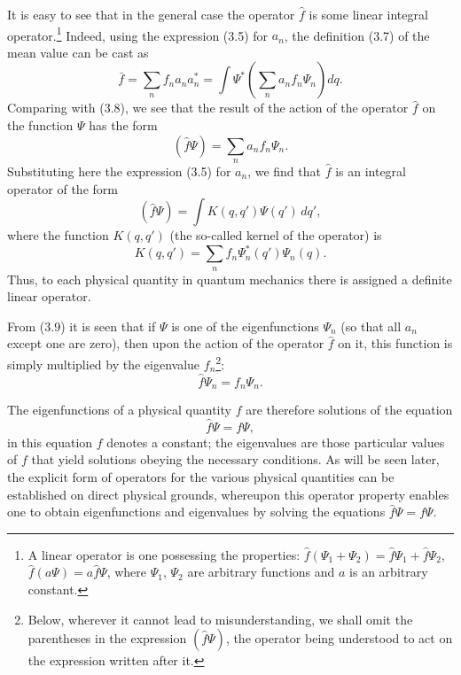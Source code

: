 It is easy to see that in the general case the operator $\hat f$ is some linear
integral operator.\footnote{A linear operator is one possessing the properties:
$\hat f(\Psi_1+\Psi_2)=\hat f\Psi_1+\hat f\Psi_2$,
$\hat f(a\Psi)=a\hat f\Psi$, where $\Psi_1$, $\Psi_2$ are arbitrary functions
and $a$ is an arbitrary constant.} Indeed, using the expression (3.5) for
$a_n$, the definition (3.7) of the mean value can be cast as
\[
  \bar f = \sum_n f_n a_n a_n^*
  = \int \Psi^*\left(\sum_n a_n f_n\Psi_n\right)dq.
\]
Comparing with (3.8), we see that the result of the action of the operator
$\hat f$ on the function $\Psi$ has the form
\begin{equation}
  (\hat f\Psi)=\sum_n a_n f_n\Psi_n.
  \tag{3.9}
\end{equation}
Substituting here the expression (3.5) for $a_n$, we find that $\hat f$ is an
integral operator of the form
\begin{equation}
  (\hat f\Psi)=\int K(q,q')\Psi(q')\,dq',
  \tag{3.10}
\end{equation}
where the function $K(q,q')$ (the so-called kernel of the operator) is
\begin{equation}
  K(q,q')=\sum_n f_n\Psi_n^*(q')\Psi_n(q).
  \tag{3.11}
\end{equation}
Thus, to each physical quantity in quantum mechanics there is assigned a
definite linear operator.

From (3.9) it is seen that if $\Psi$ is one of the eigenfunctions $\Psi_n$ (so
that all $a_n$ except one are zero), then upon the action of the operator
$\hat f$ on it, this function is simply multiplied by the eigenvalue
$f_n$\footnote{Below, wherever it cannot lead to misunderstanding, we shall
omit the parentheses in the expression $(\hat f\Psi)$, the operator being
understood to act on the expression written after it.}:
\begin{equation}
  \hat f\Psi_n=f_n\Psi_n.
  \tag{3.12}
\end{equation}

The eigenfunctions of a physical quantity $f$ are therefore solutions of the
equation
\[
  \hat f\Psi=f\Psi,
\]
in this equation $f$ denotes a constant; the eigenvalues are those particular
values of $f$ that yield solutions obeying the necessary conditions. As will be seen later, the explicit form of operators for the various
physical quantities can be established on direct physical grounds, whereupon
this operator property enables one to obtain eigenfunctions and
eigenvalues by solving the equations $\hat f\Psi=f\Psi$.

